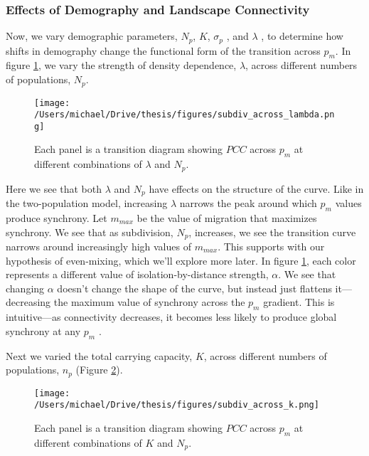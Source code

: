 \hypertarget{effects-of-demography-and-landscape-connectivity}{%
\subsubsection{Effects of Demography and Landscape
Connectivity}\label{effects-of-demography-and-landscape-connectivity}}

Now, we vary demographic parameters, \(N_p\), \(K\), \(\sigma_p\) , and
\(\lambda\) , to determine how shifts in demography change the
functional form of the transition across \(p_m\). In figure
\ref{subdiv_across_lambda}, we vary the strength of density dependence,
\(\lambda\), across different numbers of populations, \(N_p\).

\begin{figure}[h]

\texttt{[image: /Users/michael/Drive/thesis/figures/subdiv\_across\_lambda.png]}

\caption{Each panel is a transition diagram showing $PCC$ across $p_m$ at different combinations of $\lambda$ and $N_p$.}

\label{subdiv_across_lambda}

\end{figure}

Here we see that both \(\lambda\) and \(N_p\) have effects on the
structure of the curve. Like in the two-population model, increasing
\(\lambda\) narrows the peak around which \(p_m\) values produce
synchrony. Let \(m_{max}\) be the value of migration that maximizes
synchrony. We see that as subdivision, \(N_p\), increases, we see the
transition curve narrows around increasingly high values of \(m_{max}\).
This supports with our hypothesis of even-mixing, which we'll explore
more later. In figure \ref{subdiv_across_lambda}, each color represents
a different value of isolation-by-distance strength, \(\alpha\). We see
that changing \(\alpha\) doesn't change the shape of the curve, but
instead just flattens it---decreasing the maximum value of synchrony
across the \(p_m\) gradient. This is intuitive---as connectivity
decreases, it becomes less likely to produce global synchrony at any
\(p_m\) .

Next we varied the total carrying capacity, \(K\), across different
numbers of populations, \(n_p\) (Figure \ref{subdiv_across_k}).

\begin{figure}[h]

\texttt{[image: /Users/michael/Drive/thesis/figures/subdiv\_across\_k.png]}

\caption{Each panel is a transition diagram showing $PCC$ across $p_m$ at different combinations of $K$ and $N_p$.}\label{subdiv_across_k}

\end{figure}


